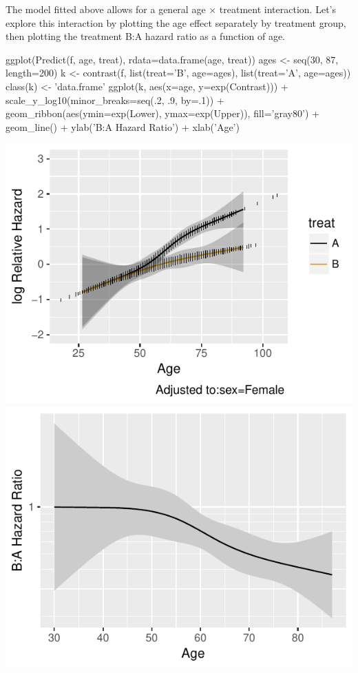 The model fitted above allows for a general age $\times$ treatment interaction.  Let's explore this interaction by plotting the age effect separately by treatment group, then plotting the treatment B:A hazard ratio as a function of age.
\begin{Schunk}
\begin{Sinput}
ggplot(Predict(f, age, treat), rdata=data.frame(age, treat))
ages <- seq(30, 87, length=200)
k <- contrast(f, list(treat='B', age=ages), list(treat='A', age=ages))
class(k) <- 'data.frame'
ggplot(k, aes(x=age, y=exp(Contrast))) + scale_y_log10(minor_breaks=seq(.2, .9, by=.1)) + 
  geom_ribbon(aes(ymin=exp(Lower), ymax=exp(Upper)), fill='gray80') +
  geom_line() +
  ylab('B:A Hazard Ratio') + xlab('Age')
\end{Sinput}


\centerline{\includegraphics[width=\maxwidth]{ancova-hteplot-1} \includegraphics[width=\maxwidth]{ancova-hteplot-2} }

\end{Schunk}

